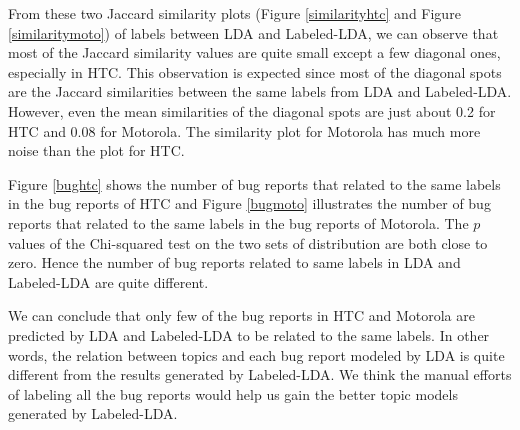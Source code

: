 \documentclass[10pt, conference, compsocconf]{IEEEtran}
\begin{document}
From these two Jaccard similarity plots (Figure \ref{similarityhtc}
and Figure \ref{similaritymoto}) of labels between LDA and
Labeled-LDA, we can observe that most of the Jaccard similarity values
are quite small except a few diagonal ones, especially in HTC. This
observation is expected since most of the diagonal spots are the
Jaccard similarities between the same labels from LDA and
Labeled-LDA. However, even the mean similarities of the diagonal spots
are just about 0.2 for HTC and 0.08 for Motorola. The similarity plot
for Motorola has much more noise than the plot for HTC.

Figure \ref{bughtc} shows the number of bug reports that related to
the same labels in the bug reports of HTC and Figure \ref{bugmoto}
illustrates the number of bug reports that related to the same labels
in the bug reports of Motorola. The $ p $ values of the Chi-squared
test on the two sets of distribution are both close to zero. Hence the
number of bug reports related to same labels in LDA and Labeled-LDA
are quite different.




We can conclude that only few of the bug reports in HTC and Motorola
are predicted by LDA and Labeled-LDA to be related to the same
labels. In other words, the relation between topics and each bug
report modeled by LDA is quite different from the results generated by
Labeled-LDA. We think the manual efforts of labeling all the bug
reports would help us gain the better topic models generated by
Labeled-LDA.
\end{document}
